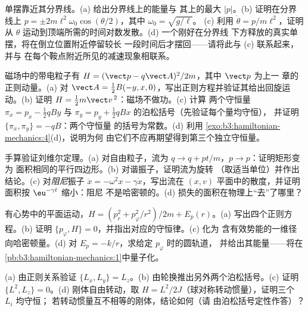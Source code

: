 \begin{exercise}[$\star\star$]\label{exo:b3:hamiltonian-mechanics:5}
单摆靠近其分界线。(a) 给出分界线上的能量与
其上的最大 $|p|$。(b) 证明在分界线上 $p =
\pm 2m\ell^2\omega_0\cos(\theta/2)$，其中 $\omega_0 = \sqrt{g/\ell}$。
(c) 利用 $\dot\theta = p/m\ell^2$，证明从 $\theta$
运动到顶端所需的时间对数发散。(d) 一个刚好在分界线
下方释放的真实单摆，将在倒立位置附近停留较长
一段时间后才摆回——请将此与 (c) 联系起来，并与
在每个鞍点附近所见的减速现象相联系。
\end{exercise}

\begin{exercise}[$\star\star$]\label{exo:b3:hamiltonian-mechanics:6}
磁场中的带电粒子有 $H = (\vect p -
q\vect A)^2/2m$，其中 $\vect p$ 为上一
章的正则动量。(a) 对 $\vect A = \tfrac12
B(-y, x, 0)$，写出正则方程并验证其给出回旋运动。(b) 证明 $H =
\tfrac12 m\vect v^{\,2}$：磁场不做功。(c) 计算
两个守恒量 $\pi_x = p_x - \tfrac12
qBy$ 与 $\pi_y = p_y + \tfrac12 qBx$ 的泊松括号（先验证每个量均守恒），
并证明 $\{\pi_x, \pi_y\} = -qB$：两个守恒量
的括号为常数。(d) 利用
\cref{exo:b3:hamiltonian-mechanics:4}(d)，说明为何
由它们不应再期望得到第三个独立守恒量。
\end{exercise}

\begin{exercise}[$\star\star$]\label{exo:b3:hamiltonian-mechanics:7}
手算验证刘维尔定理。(a) 对自由粒子，流为 $q \to q +
pt/m$，$p \to p$：证明矩形变为
面积相同的平行四边形。(b) 对谐振子，证明流为旋转
（取适当单位）并作出结论。(c) 对\emph{阻尼}振子
$\ddot x = -\omega^2x - \gamma\dot x$，写出流在
$(x, v)$ 平面中的散度，并证明面积按 $\eu^{-\gamma t}$ 缩小：阻尼
不是哈密顿的。(d) 损失的面积在物理上“去”了哪里？
\end{exercise}

\begin{exercise}[$\star\star$]\label{exo:b3:hamiltonian-mechanics:8}
有心势中的平面运动，$H = (p_r^2 + p_\varphi^2/r^2)/2m
+ E_p(r)$。(a) 写出四个正则方程。(b) 证明 $\{
p_\varphi, H\} = 0$，并指出对应的守恒律。(c) 化为
含有效势能的一维径向哈密顿量。(d)
对 $E_p = -k/r$，求给定 $p_\varphi$ 时的圆轨道，
并给出其能量——将在
\cref{pb:b3:hamiltonian-mechanics:1}中量子化。
\end{exercise}

\begin{exercise}[$\star\star$]\label{exo:b3:hamiltonian-mechanics:9}
(a) 由正则关系验证 $\{L_x, L_y\} = L_z$。(b)
由轮换推出另外两个泊松括号。(c) 证明
$\{L^2, L_z\} = 0$。(d) 刚体自由转动，取 $H =
L^2/2J$（球对称转动惯量），证明三个 $L_i$ 均守恒；
若转动惯量互不相等的刚体，结论如何（请
由泊松括号定性作答）？
\end{exercise}

